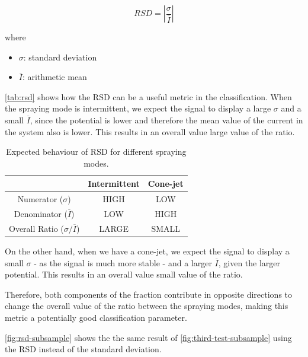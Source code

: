\documentclass[oneside,12pt]{article}
\begin{document}
\begin{equation} \label{eq:rsd}
    RSD = \left|\frac{\sigma}{\overline{I}}\right|
\end{equation}

where

\begin{itemize}
    \item $\sigma$: standard deviation
    \item $\overline{I}$: arithmetic mean
\end{itemize}

\autoref{tab:rsd} shows how the RSD can be a useful metric in the classification. When the spraying mode is intermittent, we 
expect the signal to display a large $\sigma$ and a small $\overline{I}$, since the potential is lower and therefore the mean value 
of the current in the system also is lower. This results in an overall value large value of the ratio. 

\begin{table}[h!]
    \begin{center}
      \caption{Expected behaviour of RSD for different spraying modes.}
      \label{tab:rsd}
      \begin{tabular}{c|c|c}
        \textbf{} & \textbf{Intermittent} & \textbf{Cone-jet}\\
        \hline
        Numerator ($\sigma$) & HIGH & LOW\\
        Denominator ($\overline{I}$) & LOW& HIGH\\
        Overall Ratio ($\sigma / \overline{I}$) & LARGE & SMALL\\
      \end{tabular}
    \end{center}
  \end{table}

On the other hand, when we have a cone-jet, we expect the signal to display a small $\sigma$ - as the signal is much more stable -
and a larger $\overline{I}$, given the larger potential. This results in an overall value small value of the ratio.

Therefore, both components of the fraction contribute in opposite directions to change the overall value of the ratio between the spraying modes,
making this metric a potentially good classification parameter.

\autoref{fig:rsd-subsample} shows the the same result of \autoref{fig:third-test-subsample} using the RSD instead of the standard deviation.
\end{document}
